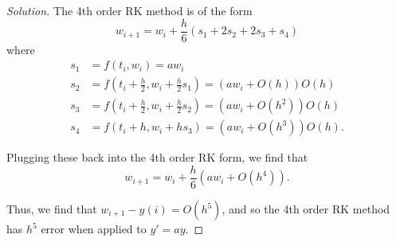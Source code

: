 \documentclass[11pt]{article}
\newenvironment{solution}
  {\renewcommand\qedsymbol{$\blacksquare$}\begin{proof}[Solution]}
  {\end{proof}}
\theoremstyle{definition}
\begin{document}
\begin{enumerate}
    \begin{solution}
    The 4th order RK method is of the form
    \[ w_{i+1} = w_i + \frac{h}{6}(s_1 + 2s_2 + 2s_3 + s_4) \]
    where \begin{align*}
    s_1 &= f(t_i, w_i) = aw_i \\
    s_2 &= f\left(t_i+\frac{h}{2}, w_i + \frac{h}{2}s_1\right) = (aw_i + O(h))O(h)\\
    s_3 &= f\left(t_i+\frac{h}{2}, w_i + \frac{h}{2}s_2\right) = (aw_i + O(h^2))O(h)\\
    s_4 &= f\left(t_i+ h, w_i + hs_3\right) = (aw_i + O(h^3))O(h).
    \end{align*}

    Plugging these back into the 4th order RK form, we find that
    \[w_{i+1} = w_i + \frac{h}{6}(aw_i + O(h^4)).\]

    Thus, we find that $w_{i+1} - y(i) = O(h^5)$, and so the 4th order RK method has $h^5$ error when applied to $y' = ay$.
    \end{solution}
\end{enumerate}
\end{document}
